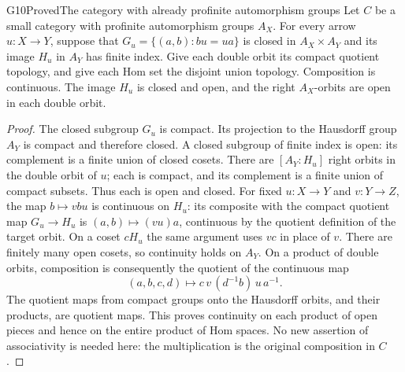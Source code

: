 \begin{result}{G10}{Proved}{The category with already profinite automorphism groups}
Let $C$ be a small category with profinite automorphism groups $A_X$.
For every arrow $u:X\to Y$, suppose that
$G_u=\{(a,b):bu=ua\}$ is closed in $A_X\times A_Y$ and its image
$H_u$ in $A_Y$ has finite index. Give each double orbit its compact
quotient topology, and give each Hom set the disjoint union topology.
Composition is continuous. The image $H_u$ is closed and open, and the
right $A_X$-orbits are open in each double orbit.
\end{result}
\begin{proof}
The closed subgroup $G_u$ is compact. Its projection to the Hausdorff
group $A_Y$ is compact and therefore closed. A closed subgroup of finite
index is open: its complement is a finite union of closed cosets.
There are $[A_Y:H_u]$ right orbits in the double orbit of $u$; each is
compact, and its complement is a finite union of compact subsets.
Thus each is open and closed. For fixed $u:X\to Y$ and $v:Y\to Z$,
the map $b\mapsto vbu$ is continuous on $H_u$: its composite with the
compact quotient map $G_u\to H_u$ is $(a,b)\mapsto(vu)a$, continuous
by the quotient definition of the target orbit. On a coset $cH_u$ the
same argument uses $vc$ in place of $v$. There are finitely many open
cosets, so continuity holds on $A_Y$. On a product of double orbits,
composition is consequently the quotient of the continuous map
\[
 (a,b,c,d)\longmapsto c\,v\,(d^{-1}b)\,u\,a^{-1}.
\]
The quotient maps from compact groups onto the Hausdorff orbits, and
their products, are quotient maps. This proves continuity on each
product of open pieces and hence on the entire product of Hom spaces.
No new assertion of associativity is needed here: the multiplication
is the original composition in $C$.
\end{proof}

